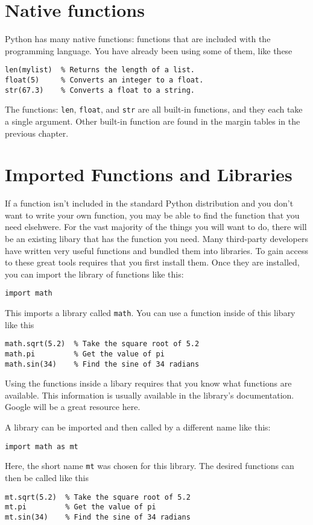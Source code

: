 \section{Native functions}
Python has many native functions: functions that are included with the
programming language.  You have already been using some of them, like these
\begin{Verbatim}
len(mylist)  % Returns the length of a list.
float(5)     % Converts an integer to a float.
str(67.3)    % Converts a float to a string.
\end{Verbatim}
The functions: \texttt{len}, \texttt{float}, and \texttt{str} are all
built-in functions, and they each take a single argument.  Other
built-in function are found in the margin tables in the previous chapter.

\section{Imported Functions and Libraries}
If a function isn't included in the standard Python distribution and
you don't want to write your own function, you may be able to find the
function that you need elsehwere.  For the vast majority of the things
you will want to do, there will be an existing libary that has the
function you need. Many third-party developers have
written very useful functions and bundled them into libraries.  To
gain access to these great tools requires that you first install
them. Once they are
installed, you can import the library of functions like this:
\begin{Verbatim}
import math
\end{Verbatim}
This imports a library called \texttt{math}.  You can use a function
inside of this libary like this
\begin{Verbatim}
math.sqrt(5.2)  % Take the square root of 5.2
math.pi         % Get the value of pi
math.sin(34)    % Find the sine of 34 radians
\end{Verbatim}
Using the functions inside a libary requires that you know what
functions are available.  This information is usually available in the
library's documentation.  Google will be a great resource here.

A library can be imported and then called by a different name like
this:
\begin{Verbatim}
import math as mt
\end{Verbatim}
Here, the short name \texttt{mt} was chosen for this library.
The desired functions can then be called like this
\begin{Verbatim}
mt.sqrt(5.2)  % Take the square root of 5.2
mt.pi         % Get the value of pi
mt.sin(34)    % Find the sine of 34 radians
\end{Verbatim}

